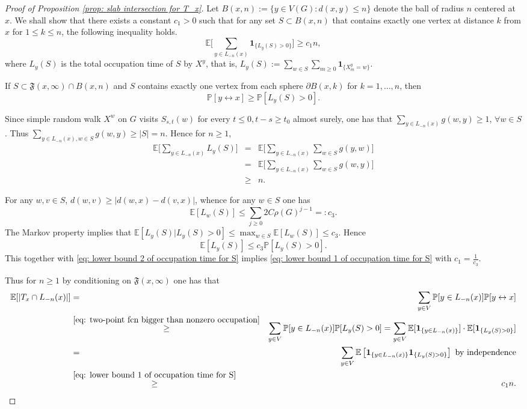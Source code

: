 \documentclass[12pt]{article}
\numberwithin{equation}{section}
\newcommand{\be}{\begin{equation}}
\newcommand{\ee}{\end{equation}}
\newcommand{\1}{\mathbf{1}}
\begin{document}
\begin{proof}[Proof of Proposition \ref{prop: slab intersection for T_x}]
 Let $B(x,n):=\{y\in V(G)\colon d(x,y)\leq n\}$ denote the ball of radius $n$ centered at $x$. We shall show that there exists a constant $c_{1}>0$ such that for any set $S\subset B(x,n)$ that contains exactly one vertex at distance $k$ from $x$ for $1\leq k\leq n$, the following inequality holds.
 \be\label{eq: lower bound 1 of occupation time for S}
 \mathbb{E}\Big[\sum_{y\in L_{-n}(x)}{ \mathbf{1}_{ \{L_y(S)>0\} } }\Big]\geq c_{1}n,
 \ee
 where $L_y(S)$ is the total occupation time of $S$ by $X^y$, that is, $L_y(S):=\sum_{w\in S}\sum_{m\geq0}\mathbf{1}_{\{X_m^y=w\}}$. 
 
 If $S\subset \mathfrak{F}(x,\infty)\cap B(x,n)$ and $S$ contains exactly one vertex from each sphere $\partial B(x,k)$ for $ k=1,\ldots,n$, then 
 \be\label{eq: two-point fcn bigger than nonzero occupation}
 \mathbb{P}[y\leftrightarrow x]\geq \mathbb{P}[L_y(S)>0].
 \ee
 
 Since simple random walk $X^w$ on $G$ visits $S_{s,t}(w)$ for every $t\leq 0,t-s\geq t_0$ almost surely, one has that $\sum_{y\in L_{-n}(x)}{g(w,y)}\geq1$, $\forall w\in S$. Thus 
 $\sum_{y\in L_{-n}(x),w\in S}{g(w,y)}\geq |S|= n$. Hence for $n\geq1$,   
 \begin{eqnarray}\label{eq: lower bound 2 of occupation time for S}
\mathbb{E}\Big[\sum_{y\in L_{-n}(x)}L_y(S)\Big] 
&= & \mathbb{E}\Big[\sum_{y\in L_{-n}(x)}\sum_{w\in S}g(y,w)\Big] \nonumber\\
&=&\mathbb{E}\Big[\sum_{y\in L_{-n}(x)}\sum_{w\in S}g(w,y)\Big] \nonumber\\
&\geq&n.
 \end{eqnarray}
 
 For any $w,v\in S$, $d(w,v)\geq |d(w,x)-d(v,x)|$, whence for any $w\in S$ one has 
 \[
 \mathbb{E}[L_w(S)]\leq \sum_{j\geq0}2C\rho(G)^{j-1}=:c_{3}.
 \]
 The Markov property implies that $\mathbb{E}[L_y(S)|L_y(S)>0]\leq \max_{w\in S}\mathbb{E}[L_w(S)]\leq c_{3}$. Hence 
 \[
 \mathbb{E}[L_y(S)]\leq c_{3}\mathbb{P}[L_y(S)>0].
 \]
 This together with \eqref{eq: lower bound 2 of occupation time for S} implies \eqref{eq: lower bound 1 of occupation time for S} with $c_1=\frac{1}{c_{3}}$. 
 
 Thus for $n\geq 1$ by conditioning on $\mathfrak{F}(x,\infty)$ one has that 
\begin{eqnarray}
\mathbb{E}[|T_x\cap L_{-n}(x)|]&=&
\sum_{y\in V}\mathbb{P}[y\in L_{-n}(x)]\mathbb{P}[y\leftrightarrow x]\nonumber\\
&\stackrel{\eqref{eq: two-point fcn bigger than nonzero occupation}}{\geq}&
\sum_{y\in V}\mathbb{P}[y\in L_{-n}(x)]\mathbb{P}[L_y(S)>0]=\sum_{y\in V}\mathbb{E}[\mathbf{1}_{\{ y\in L_{-n}(x) \}}]\cdot \mathbb{E}[\mathbf{1}_{\{L_y(S)>0\}}]\nonumber\\
&=&
\sum_{y\in V}\mathbb{E}\left[\mathbf{1}_{\{ y\in L_{-n}(x) \}}  \mathbf{1}_{\{L_y(S)>0\}}\right] \textnormal{ by independence}\nonumber\\
&\stackrel{\eqref{eq: lower bound 1 of occupation time for S}}{\geq }&c_{1}n.
\end{eqnarray}



\end{proof}
\end{document}
